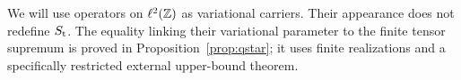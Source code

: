 We will use operators on \(\ell^2(\mathbb Z)\) as variational carriers. Their
appearance does not redefine \(S_{\mathrm t}\). The equality linking their variational
parameter to the finite tensor supremum is proved in
Proposition~\ref{prop:qstar}; it uses finite realizations and a specifically
restricted external upper-bound theorem.
